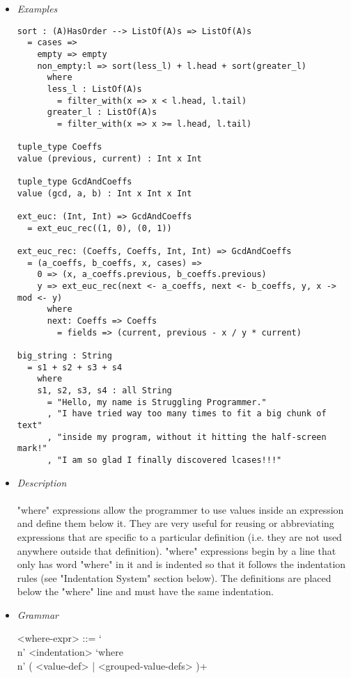 \documentclass{article}
\begin{document}
\begin{itemize}

\item \textit{Examples}
\begin{verbatim}
sort : (A)HasOrder --> ListOf(A)s => ListOf(A)s
  = cases => 
    empty => empty
    non_empty:l => sort(less_l) + l.head + sort(greater_l)
      where
      less_l : ListOf(A)s
        = filter_with(x => x < l.head, l.tail)
      greater_l : ListOf(A)s
        = filter_with(x => x >= l.head, l.tail)

tuple_type Coeffs
value (previous, current) : Int x Int

tuple_type GcdAndCoeffs
value (gcd, a, b) : Int x Int x Int

ext_euc: (Int, Int) => GcdAndCoeffs
  = ext_euc_rec((1, 0), (0, 1))

ext_euc_rec: (Coeffs, Coeffs, Int, Int) => GcdAndCoeffs
  = (a_coeffs, b_coeffs, x, cases) =>
    0 => (x, a_coeffs.previous, b_coeffs.previous)
    y => ext_euc_rec(next <- a_coeffs, next <- b_coeffs, y, x -> mod <- y)
      where
      next: Coeffs => Coeffs
        = fields => (current, previous - x / y * current)

big_string : String
  = s1 + s2 + s3 + s4
    where
    s1, s2, s3, s4 : all String
      = "Hello, my name is Struggling Programmer."
      , "I have tried way too many times to fit a big chunk of text"
      , "inside my program, without it hitting the half-screen mark!"
      , "I am so glad I finally discovered lcases!!!"
\end{verbatim}

\item \textit{Description}\\\\
"where" expressions allow the programmer to use values inside an expression and
define them below it. They are very useful for reusing or abbreviating
expressions that are specific to a particular definition (i.e. they are not
used anywhere outside that definition). "where" expressions begin by a line
that only has word "where" in it and is indented so that it follows the
indentation rules (see "Indentation System" section below).
The definitions are placed below the "where" line and must have the same
indentation. 

\item \textit{Grammar}
\begin{grammar}
<where-expr> ::=
`\\n' <indentation> `where\\n' ( <value-def> | <grouped-value-defs> )+
\end{grammar}

\end{itemize}
\end{document}
